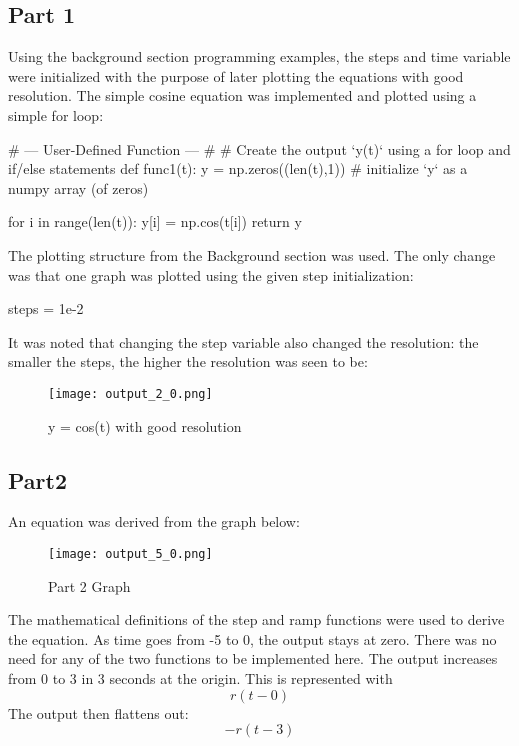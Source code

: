 \documentclass[12pt]{article}
\begin{document}
\subsection{Part 1}
Using the background section programming examples, the steps and time variable were initialized with the purpose of later plotting the equations with good resolution. The simple cosine equation was implemented and plotted using a simple for loop:
\begin{python}
# --- User-Defined Function --- #
# Create the output `y(t)` using a for loop and if/else statements
def func1(t):
    y = np.zeros((len(t),1)) # initialize `y` as a numpy array (of zeros)

    for i in range(len(t)):
        y[i] = np.cos(t[i])
    return y
\end{python}   
The plotting structure from the Background section was used. The only change was that one graph was plotted using the given step initialization:
\begin{python}
steps = 1e-2
\end{python}
It was noted that changing the step variable also changed the resolution: the smaller the steps, the higher the resolution was seen to be:
\begin{figure}[H]
\texttt{[image: output\_2\_0.png]}
  \caption{y = cos(t) with good resolution}
  \end{figure}
\subsection{Part2}
An equation was derived from the graph below:
\begin{figure}[H]
\texttt{[image: output\_5\_0.png]}
  \caption{Part 2 Graph}
  \end{figure}
  
The mathematical definitions of the step and ramp functions were used to derive the equation.
As time goes from -5 to 0, the output stays at zero. There was no need for any of the two functions to be implemented here.
The output increases from 0 to 3 in 3 seconds at the origin. This is represented with
\[r(t-0)\]
The output then flattens out:
\[-r(t-3)\]
\end{document}
